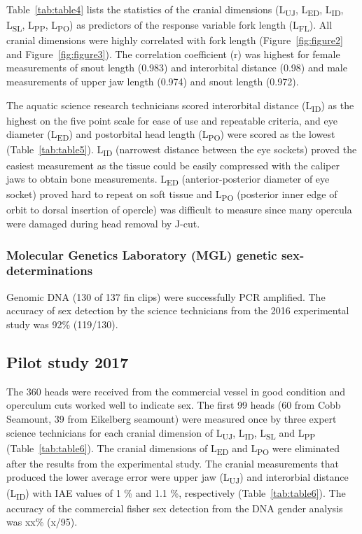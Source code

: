\documentclass[12pt]{article}\usepackage[]{graphicx}\usepackage[]{color}
\begin{document}
Table~\ref{tab:table4} lists the statistics of the cranial dimensions (L\textsubscript{UJ}, L\textsubscript{ED}, L\textsubscript{ID}, L\textsubscript{SL}, L\textsubscript{PP}, L\textsubscript{PO}) as predictors of the response variable fork length (L\textsubscript{FL}). All cranial dimensions were highly correlated with fork length (Figure~\ref{fig:figure2} and Figure~\ref{fig:figure3}). The correlation coefficient (r) was highest for female measurements of snout length (0.983) and interorbital distance (0.98) and male measurements of upper jaw length (0.974) and snout length (0.972).

The aquatic science research technicians scored interorbital distance (L\textsubscript{ID}) as the highest on the five point scale for ease of use and repeatable criteria, and eye diameter (L\textsubscript{ED}) and postorbital head length (L\textsubscript{PO}) were scored as the lowest (Table~\ref{tab:table5}). L\textsubscript{ID} (narrowest distance between the eye sockets) proved the easiest measurement as the tissue could be easily compressed with the caliper jaws to obtain bone measurements. L\textsubscript{ED} (anterior-posterior diameter of eye socket) proved hard to repeat on soft tissue and L\textsubscript{PO} (posterior inner edge of orbit to dorsal insertion of opercle) was difficult to measure since many opercula were damaged during head removal by J-cut.

\hypertarget{molecular-genetics-laboratory-mgl-genetic-sex-determinations}{%
\subsubsection{Molecular Genetics Laboratory (MGL) genetic sex-determinations}\label{molecular-genetics-laboratory-mgl-genetic-sex-determinations}}

Genomic DNA (130 of 137 fin clips) were successfully PCR amplified. The accuracy of sex detection by the science technicians from the 2016 experimental study was 92\% (119/130).

\hypertarget{pilot-study-2017-1}{%
\subsection{Pilot study 2017}\label{pilot-study-2017-1}}

The 360 heads were received from the commercial vessel in good condition and operculum cuts worked well to indicate sex. The first 99 heads (60 from Cobb Seamount, 39 from Eikelberg seamount) were measured once by three expert science technicians for each cranial dimension of L\textsubscript{UJ}, L\textsubscript{ID}, L\textsubscript{SL} and L\textsubscript{PP} (Table~\ref{tab:table6}). The cranial dimensions of L\textsubscript{ED} and L\textsubscript{PO} were eliminated after the results from the experimental study. The cranial measurements that produced the lower average error were upper jaw (L\textsubscript{UJ}) and interorbial distance (L\textsubscript{ID}) with IAE values of 1 \% and 1.1 \%, respectively (Table~\ref{tab:table6}). The accuracy of the commercial fisher sex detection from the DNA gender analysis was xx\% (x/95).
\end{document}
